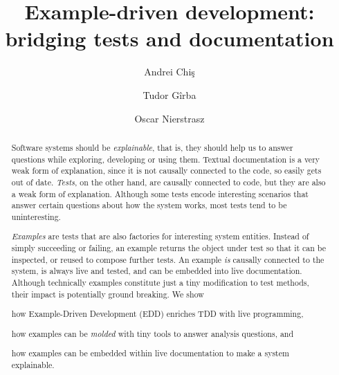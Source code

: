\documentclass[sigplan,anonymous,review,10pt]{acmart}
\begin{document}
\title[Example-driven development: bridging tests and documentation]{Example-driven development: \\ bridging tests and documentation}
\author{Andrei Chi\c{s}}
\author{Tudor G\^irba}
\author{Oscar Nierstrasz}

\renewcommand{\shortauthors}{Chi\c{s} et al.}

\begin{abstract}
Software systems should be \emph{explainable}, that is, they should help us to answer questions while exploring, developing or using them.
Textual documentation is a very weak form of explanation, since it is not causally connected to the code, so easily gets out of date.
\emph{Tests}, on the other hand, are causally connected to code, but they are also a weak form of explanation.
Although some tests encode interesting scenarios that answer certain questions about how the system works, most tests tend to be uninteresting.

\emph{Examples} are tests that are also factories for interesting system entities.
Instead of simply succeeding or failing, an example returns the object under test so that it can be inspected, or reused to compose further tests.
An example \emph{is} causally connected to the system, is always live and tested, and can be embedded into live documentation.
Although technically examples constitute just a tiny modification to test methods, their impact is potentially ground breaking.
We show
\begin{inparaenum}[(i)]
	\item how Example-Driven Development (EDD) enriches TDD with live programming,
	\item how examples can be \emph{molded} with tiny tools to answer analysis questions, and
    \item how examples can be embedded within live documentation to make a system explainable.
\end{inparaenum}
\end{abstract}

\end{document}
